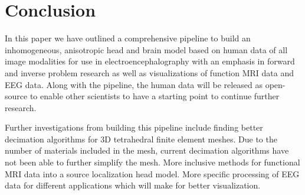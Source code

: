 %
%

\section{Conclusion}
\label{sec:Conclusion}

In this paper we have outlined a comprehensive pipeline to build an inhomogeneous, anisotropic head and brain model based on human data of all image modalities for use in electroencephalography with an emphasis in forward and inverse problem research as well as visualizations of function MRI data and EEG data. Along with the pipeline, the human data will be released as open-source to enable other scientists to have a starting point to continue further research. 

Further investigations from building this pipeline include finding better decimation algorithms for 3D tetrahedral finite element meshes. Due to the number of materials included in the mesh, current decimation algorithms have not been able to further simplify the mesh. More inclusive methods for functional MRI data into a source localization head model. More specific processing of EEG data for different applications which will make for better visualization. 
